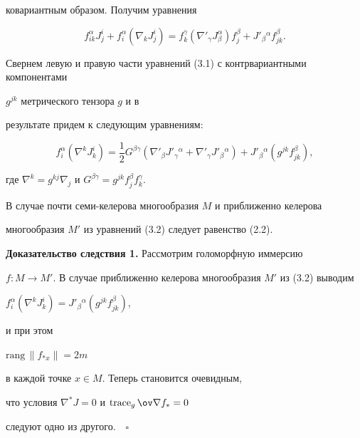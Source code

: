 ковариантным образом. Получим уравнения


\begin{equation}


f_{ik}^\alpha J_j^i+f_i^\alpha(\nabla _k J_j^i)=f_k^\gamma(\nabla '_\gamma


J_\beta ^\alpha)f_j^\beta +J'_\beta{}^\alpha f_{jk}^\beta .


\tag{3.1}


\end{equation}


Свернем левую и правую части уравнений (3.1) с контрвариантными компонентами


$g^{jk}$ метрического тензора $g$ и в


результате придем к следующим уравнениям:


\begin{equation}


f_i^\alpha (\nabla ^k J_k^i)=\frac{1}{2}G^{\beta \gamma }(\nabla '_\beta


J'_\gamma{}^\alpha+\nabla '_\gamma J'_\beta{}^\alpha)+


J'_\beta{}^\alpha(g^{jk}


f_{jk}^\beta), \tag{3.2}


\end{equation}


где $\nabla ^k=g^{kj} \nabla _j$ и $G^{\beta \gamma }=


g^{jk} f_j^\beta f_k^\gamma$.


В случае почти семи-келерова многообразия $M$ и приближенно келерова 


многообразия $M'$ из уравнений (3.2) следует равенство (2.2).


\medskip





{\bf Доказательство следствия 1.} Рассмотрим голоморфную иммерсию


$f:M \to M'$. В случае приближенно келерова многообразия $M'$ из (3.2) выводим


$f_i^\alpha(\nabla ^k J_k^i)=J'_\beta{}^\alpha(g^{jk} f_{jk}^\beta)$,


и при этом


$\mathrm{rang}\,\| f_{\ast x}\|=2m$


в каждой точке $x \in M$. Теперь становится очевидным,


что условия $\nabla ^* J=0$ и $\trace_g \ov \nabla f_*=0$


следуют одно из другого.$\quad\square$


